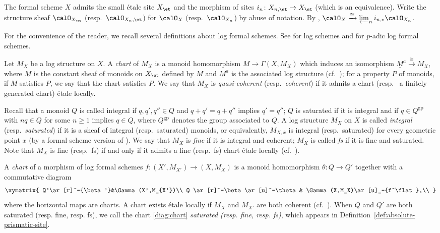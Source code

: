 The formal scheme $X$ admits the small \'etale site $X_\et$ and the morphism of sites $i_n\colon X_{n,\et}\rightarrow X_\et$ (which is an equivalence). Write the structure sheaf $\calO_{X_\et}$ (resp.~$\calO_{X_n,\et}$) for $\calO_X$ (resp.~$\calO_{X_n}$) by abuse of notation. By \cite[Lem.~I.6.2.11]{fujiwara-kato}, $\calO_X\xrightarrow{\cong}\varprojlim_ni_{n,\ast}\calO_{X_n}$.

For the convenience of the reader, we recall several definitions about log formal schemes. See \cite{Kato-log,Ogus-log} for log schemes and \cite[\S2]{Shiho-I} for $p$-adic log formal schemes.

Let $M_X$ be a log structure on $X$. A \emph{chart} of $M_X$ is a monoid homomorphism $M\rightarrow\Gamma(X,M_X)$ which induces an isomorphism $\underline{M}^a\xrightarrow{\cong}M_X$, where $\underline{M}$ is the constant sheaf of monoids on $X_\et$ defined by $M$ and $\underline{M}^a$ is the associated log structure (cf.~\cite[Def.~2.1.2]{Shiho-I}); for a property $P$ of monoids, if $M$ satisfies $P$, we say that the chart satisfies $P$. We say that $M_X$ is \emph{quasi-coherent} (resp.~\emph{coherent}) if it admits a chart (resp.~ a finitely generated chart) \'etale locally.

Recall that a monoid $Q$ is called integral if $q, q',q''\in Q$ and $q+q'=q+q''$ implies $q'=q''$; $Q$ is saturated if it is integral and if $q\in Q^\mathrm{gp}$ with $nq\in Q$ for some $n\geq 1$ implies $q\in Q$, where $Q^\mathrm{gp}$ denotes the group associated to $Q$.
A log structure $M_X$ on $X$ is called \emph{integral} (resp.~\emph{saturated}) if it is a sheaf of integral (resp.~saturated) monoids, or equivalently, $M_{X,\overline{x}}$ is integral (resp.~saturated) for every geometric point $x$ (by a formal scheme version of \cite[Prop.~II.2.1.3]{Ogus-log}). 
We say that $M_X$ is \emph{fine} if it is integral and coherent; $M_X$ is called \emph{fs} if it is fine and saturated. Note that $M_X$ is fine (resp.~fs) if and only if it admits a fine (resp.~fs) chart \'etale locally (cf.~\cite[Cor.~II.2.3.6]{Ogus-log}). 

A \emph{chart} of a morphism of log formal schemes $f\colon (X',M_{X'})\rightarrow (X,M_X)$ is a monoid homomorphism $\theta\colon Q\rightarrow Q'$ together with a commutative diagram
\begin{equation}\label{diag:chart}
\xymatrix{
Q'\ar[r]^-{\beta'}&\Gamma(X',M_{X'})\\
Q \ar[r]^-\beta\ar[u]^-\theta& \Gamma(X,M_X)\ar[u]_-{f^\flat},\\
}
\end{equation}
where the horizontal maps are charts. A chart exists \'etale locally if $M_X$ and $M_{X'}$ are both coherent (cf.~\cite[Prop.~II.2.4.2]{Ogus-log}). When $Q$ and $Q'$ are both saturated (resp. fine, resp. fs), we call the chart \eqref{diag:chart} \emph{saturated (resp. fine, resp. fs)}, which appears in Definition~\ref{def:absolute-prismatic-site}. 

